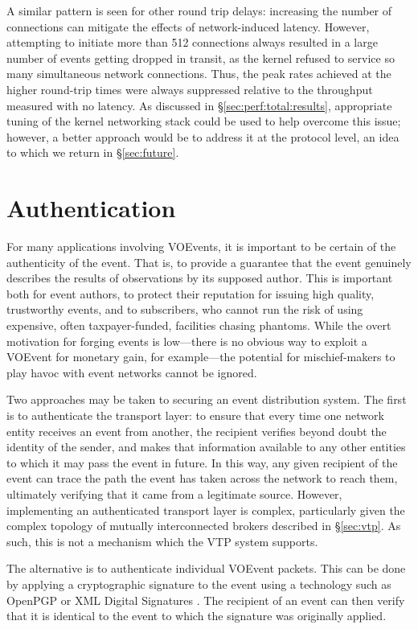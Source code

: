 \documentclass[5p,authoryear]{elsarticle}
\begin{document}
A similar pattern is seen for other round trip delays: increasing the number
of connections can mitigate the effects of network-induced latency. However,
attempting to initiate more than 512 connections always resulted in a large
number of events getting dropped in transit, as the kernel refused to service
so many simultaneous network connections. Thus, the peak rates achieved at the
higher round-trip times were always suppressed relative to the throughput
measured with no latency. As discussed in \S\ref{sec:perf:total:results},
appropriate tuning of the kernel networking stack could be used to help
overcome this issue; however, a better approach would be to address it at the
protocol level, an idea to which we return in \S\ref{sec:future}.

\section{Authentication}
\label{sec:security}

For many applications involving VOEvents, it is important to be certain of the
authenticity of the event. That is, to provide a guarantee that the event
genuinely describes the results of observations by its supposed author. This
is important both for event authors, to protect their reputation for issuing
high quality, trustworthy events, and to subscribers, who cannot run the risk
of using expensive, often taxpayer-funded, facilities chasing phantoms. While
the overt motivation for forging events is low---there is no obvious way to
exploit a VOEvent for monetary gain, for example---the potential for
mischief-makers to play havoc with event networks cannot be ignored.

Two approaches may be taken to securing an event distribution system. The
first is to authenticate the transport layer: to ensure that every time one
network entity receives an event from another, the recipient verifies beyond
doubt the identity of the sender, and makes that information available to any
other entities to which it may pass the event in future. In this way, any
given recipient of the event can trace the path the event has taken across the
network to reach them, ultimately verifying that it came from a legitimate
source.  However, implementing an authenticated transport layer is complex,
particularly given the complex topology of mutually interconnected brokers
described in \S\ref{sec:vtp}. As such, this is not a mechanism which the VTP
system supports.

The alternative is to authenticate individual VOEvent packets. This can be
done by applying a cryptographic signature to the event using a technology
such as OpenPGP \citep{Callas:2007} or XML Digital Signatures
\citep{Bartel:2008}. The recipient of an event can then verify that it is
identical to the event to which the signature was originally applied.
\end{document}
